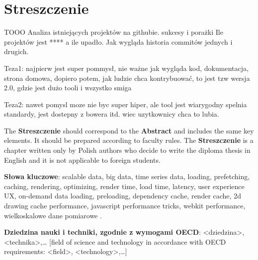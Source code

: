 \chapter*{Streszczenie}

TOOO
Analiza istniejących projektów na githubie. sukcesy i porażki
Ile projektów jest **** a ile upadło.
Jak wygląda historia commitów jednych i drugich.

Teza1: najpierw jest super pommysł, nie ważne jak wygląda kod, dokumentacja, strona domowa, dopiero potem, jak ludzie chca kontrybuować, to jest tzw wersja 2.0, gdzie jest dużo tooli i wszystko smiga

Teza2: nawet pomysl moze nie byc super hiper, ale tool jest wiarygodny spelnia standardy, jest dostepny z bowera itd. wiec uzytkownicy chca to lubia.


The \textbf{Streszczenie} should correspond to the \textbf{Abstract} and includes the same key elements. It  should be prepared according to faculty rules. The \textbf{Streszczenie} is a chapter written only by Polish authors who decide to write the diploma thesis in English and it is not applicable to foreign students. 

\vspace{12pt}
\noindent\textbf{Słowa kluczowe}:
scalable data,
big data,
time series data,
loading, prefetching, caching,
rendering, optimizing,
render time, load time, latency,
user experience UX,
on-demand data loading, preloading,
dependency cache,
render cache,
2d drawing cache performance,
javascript performance tricks,
webkit performance,
wielkoskalowe dane pomiarowe
.


\vspace{12pt}
\noindent\textbf{Dziedzina nauki i techniki, zgodnie z wymogami OECD}: \textless{}dziedzina\textgreater{}, \textless{}technika\textgreater{},\ldots
[field of science and technology in accordance with OECD requirements: \textless{}field\textgreater{}, \textless{}technology\textgreater{},\ldots]